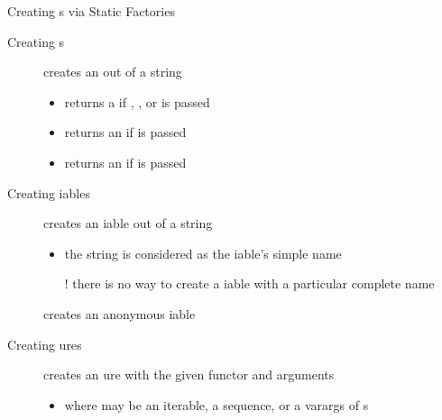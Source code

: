 \documentclass[handout]{beamer}
\begin{document}
\begin{frame}[allowframebreaks]{Creating s via Static Factories}
    \framebreak

    \begin{block}{Creating s}
        \begin{description}
            \item[] creates an  out of a string
            \begin{itemize}\small
                \item returns a  if , , or  is passed
                \item returns an  if  is passed
                \item returns an  if  is passed
            \end{itemize}
        \end{description}
    \end{block}

    \framebreak

    \begin{block}{Creating iables}
        \begin{description}
            \item[] creates an iable out of a string
            \begin{itemize}\small
                \item the string is considered as the iable's \alert{simple} name
                \item[!] there is \alert{no way} to create a iable with a particular \alert{complete} name
            \end{itemize}

            \item[] creates an anonymous iable
        \end{description}
    \end{block}


    \framebreak

    \begin{block}{Creating ures}
        \begin{description}
            \item[] creates an ure with the given functor and arguments
            \begin{itemize}\small
                \item where  may be an iterable, a sequence, or a varargs of s
            \end{itemize}


\end{description}
\end{block}
\end{frame}
\end{document}
